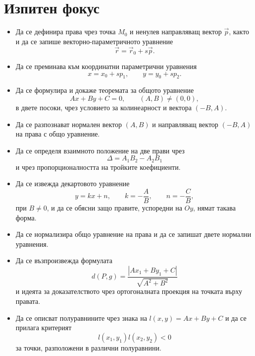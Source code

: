 \section{Изпитен фокус}\label{s:28.7}

\begin{itemize}
 \item Да се дефинира права чрез точка $M_0$ и ненулев направляващ
 вектор $\vec p$, както и да се запише векторно-параметричното
 уравнение
 \[
 \vec r=\vec r_0+s\vec p.
 \]

 \item Да се преминава към координатни параметрични уравнения
 \[
 x=x_0+sp_1,\qquad y=y_0+sp_2.
 \]

 \item Да се формулира и докаже теоремата за общото уравнение
 \[
 Ax+By+C=0,\qquad (A,B)\neq(0,0),
 \]
 в двете посоки, чрез условието за колинеарност и вектора
 $(-B,A)$.

 \item Да се разпознават нормален вектор $(A,B)$ и направляващ вектор
 $(-B,A)$ на права с общо уравнение.

 \item Да се определя взаимното положение на две прави чрез
 \[
 \Delta=A_1B_2-A_2B_1
 \]
 и чрез пропорционалността на тройките коефициенти.

 \item Да се извежда декартовото уравнение
 \[
 y=kx+n,\qquad k=-\frac AB,\qquad n=-\frac CB,
 \]
 при $B\neq0$, и да се обясни защо правите, успоредни на $Oy$, нямат
 такава форма.

 \item Да се нормализира общо уравнение на права и да се запишат двете
 нормални уравнения.

 \item Да се възпроизвежда формулата
 \[
 d(P,g)=\frac{|Ax_1+By_1+C|}{\sqrt{A^2+B^2}}
 \]
 и идеята за доказателството чрез ортогоналната проекция на точката
 върху правата.

 \item Да се описват полуравнините чрез знака на
 $l(x,y)=Ax+By+C$ и да се прилага критерият
 \[
 l(x_1,y_1)l(x_2,y_2)<0
 \]
 за точки, разположени в различни полуравнини.
\end{itemize}
